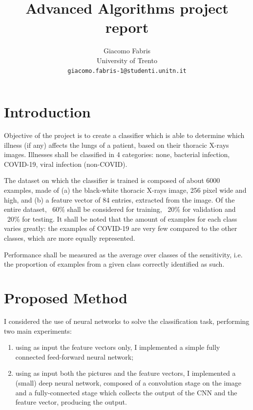 \documentclass[10pt,a4paper,twocolumn]{article}
\begin{document}
\title{\textsf{Advanced Algorithms project report}}

\author{Giacomo Fabris\\
University of Trento\\
{\tt\small giacomo.fabris-1@studenti.unitn.it}
}

\maketitle

\section{Introduction}

Objective of the project is to create a classifier which is able to determine which illness (if any) affects the lungs of a patient, based on their thoracic X-rays images. Illnesses shall be classified in 4 categories: none, bacterial infection, COVID-19, viral infection (non-COVID).

The dataset on which the classifier is trained is composed of about 6000 examples, made of (a) the black-white thoracic X-rays image, 256 pixel wide and high, and (b) a feature vector of 84 entries, extracted from the image. Of the entire dataset, ~60\% shall be considered for training, ~20\% for validation and ~20\% for testing. It shall be noted that the amount of examples for each class varies greatly: the examples of COVID-19 are very few compared to the other classes, which are more equally represented.

Performance shall be measured as the average over classes of the sensitivity, i.e. the proportion of examples from a given class correctly identified as such. 

\section{Proposed Method}

I considered the use of neural networks to solve the classification task, performing two main experiments:
\begin{enumerate}
    \item using as input the feature vectors only, I implemented a simple fully connected feed-forward neural network;
    \item using as input both the pictures and the feature vectors, I implemented a (small) deep neural network, composed of a convolution stage on the image and a fully-connected stage which collects the output of the CNN and the feature vector, producing the output.
\end{enumerate}
\end{document}
